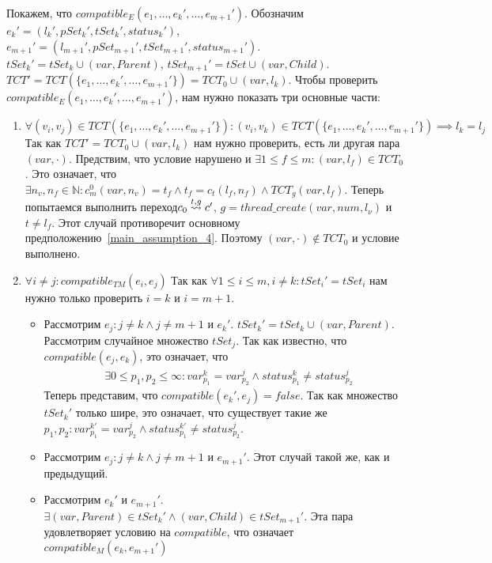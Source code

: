 Покажем, что $compatible_E(e_1, \dots, e_k', \dots, e_{m+1}')$.
Обозначим $e_k' = (l_k', pSet_k', tSet_k', status_k')$, $e_{m+1}' = (l_{m+1}', pSet_{m+1}', tSet_{m+1}', status_{m+1}')$.
$tSet_k' = tSet_k \cup (var, Parent)$, $tSet_{m+1}' = tSet \cup (var, Child)$.
$TCT' = TCT(\{e_1, \dots, e_k', \dots, e_{m+1}'\}) = TCT_0 \cup {(var, l_k)}$. 
Чтобы проверить $compatible_E(e_1, \dots, e_k', \dots, e_{m+1}')$, нам нужно показать три основные части:
\begin{enumerate}
\item $\forall (v_i, v_j) \in TCT(\{e_1, \dots, e_k', \dots, e_{m+1}'\}): (v_i, v_k) \in TCT(\{e_1, \dots, e_k', \dots, e_{m+1}'\}) \implies l_k = l_j$
Так как $TCT' = TCT_0 \cup {(var, l_k)}$ нам нужно проверить, есть ли другая пара $(var, \cdot)$.
Предствим, что условие нарушено и $\exists 1 \le f \le m: (var, l_f) \in TCT_0$.
Это означает, что $\exists n_v, n_f \in \mathbb{N}: c^0_m(var, n_v) = t_f \land t_f = c_t(l_f, n_f) \land TCT_g(var, l_f)$.
Теперь попытаемся выполнить переход$c_0 \stackrel{t, g}{\leadsto} c'$, $g = thread\_create(var, num, l_{\nu})$ и $t \neq l_f$. 
Этот случай противоречит основному предположению~\ref{main_assumption_4}.
Поэтому $(var, \cdot) \notin TCT_0$ и условие выполнено.
\item $\forall i \neq j: compatible_{TM}(e_i, e_j)$
Так как $\forall 1 \le i \le m, i \neq k: tSet_i' = tSet_i$ нам нужно только проверить $i = k$ и $i = m +1$.
\begin{itemize}
\item Рассмотрим $e_j:j \neq k \land j \neq m + 1$ и $e_k'$. 
$tSet_k' = tSet_k \cup (var, Parent)$. Рассмотрим случайное множество $tSet_j$. Так как известно, что $compatible(e_j, e_k)$, это означает, что 
\begin{align}
& \exists 0 \le p_1, p_2 \le \infty: var^k_{p_1} = var^j_{p_2} \land status^k_{p_1} \neq status^j_{p_2} \nonumber
\end{align}
Теперь представим, что $compatible(e_k', e_j) = false$. Так как множество $tSet_k'$ только шире, это означает, что существует такие же $p_1, p_2: var^{k'}_{p_1} = var^j_{p_2} \land status^{k'}_{p_1} \neq status^j_{p_2}$.
\item Рассмотрим $e_j:j \neq k \land j \neq m + 1$ и $e_{m+1}'$. Этот случай такой же, как и предыдущий.
\item Рассмотрим $e_k'$ и $e_{m+1}'$.
$\exists(var, Parent) \in tSet_k' \land (var, Child) \in tSet_{m+1}'$. Эта пара удовлетворяет условию на $compatible$, что означает$compatible_M(e_k, e_{m+1}')$
\end{itemize}

\end{enumerate}

